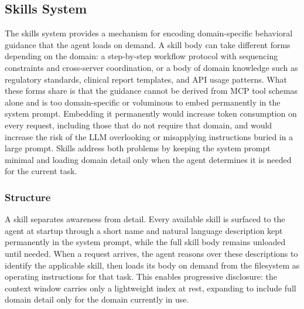 \documentclass[conference]{IEEEtran}
\begin{document}

\subsection{Skills System}
\label{sec:skills}

The skills system provides a mechanism for encoding domain-specific
behavioral guidance that the agent loads on demand. A skill body can
take different forms depending on the domain: a step-by-step workflow
protocol with sequencing constraints and cross-server coordination, or
a body of domain knowledge such as regulatory standards, clinical
report templates, and API usage patterns. What these forms share is
that the guidance cannot be derived from MCP tool schemas alone and is
too domain-specific or voluminous to embed permanently in the system
prompt.
Embedding it permanently would increase token consumption on
every request, including those that do not require that domain, and
would increase the risk of the LLM overlooking or misapplying
instructions buried in a large prompt. Skills address
both problems by keeping the system prompt minimal and loading domain
detail only when the agent determines it is needed for the current
task.

\subsubsection{Structure}
A skill separates awareness from detail. Every available skill is
surfaced to the agent at startup through a short name and natural
language description kept permanently in the system prompt, while the
full skill body remains unloaded until needed. When a request arrives,
the agent reasons over these descriptions to identify the applicable
skill, then loads its body on demand from the filesystem as operating instructions for that
task. This enables progressive disclosure: the context window carries
only a lightweight index at rest, expanding to include full domain
detail only for the domain currently in use.
\end{document}
